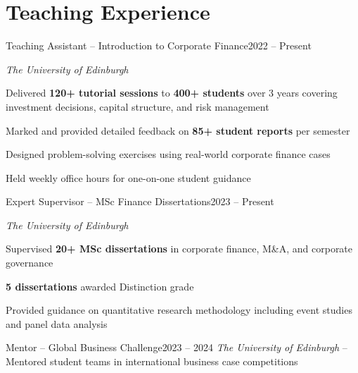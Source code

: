 \section{Teaching Experience}

\begin{joblong}{Teaching Assistant -- Introduction to Corporate Finance}{2022 -- Present}
\item \textit{The University of Edinburgh}
\item Delivered \textbf{120+ tutorial sessions} to \textbf{400+ students} over 3 years covering investment decisions, capital structure, and risk management
\item Marked and provided detailed feedback on \textbf{85+ student reports} per semester
\item Designed problem-solving exercises using real-world corporate finance cases
\item Held weekly office hours for one-on-one student guidance
\end{joblong}

\vspace{4pt}

\begin{joblong}{Expert Supervisor -- MSc Finance Dissertations}{2023 -- Present}
\item \textit{The University of Edinburgh}
\item Supervised \textbf{20+ MSc dissertations} in corporate finance, M\&A, and corporate governance
\item \textbf{5 dissertations} awarded Distinction grade
\item Provided guidance on quantitative research methodology including event studies and panel data analysis
\end{joblong}

\vspace{4pt}

\begin{jobshort}{Mentor -- Global Business Challenge}{2023 -- 2024}
\textit{The University of Edinburgh} -- Mentored student teams in international business case competitions
\end{jobshort}
